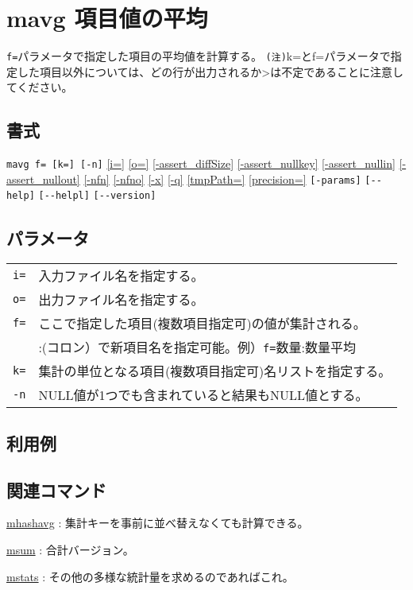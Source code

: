 
%

\section{mavg 項目値の平均\label{sect:mavg}}
\verb|f=|パラメータで指定した項目の平均値を計算する。
\verb|(注)|k=とf=パラメータで指定した項目以外については、どの行が出力されるか>は不定であることに注意してください。\\

\subsection*{書式}
\verb|mavg f= [k=] [-n]|
\hyperref[sect:option_i]{[i=]}
\hyperref[sect:option_o]{[o=]}
\hyperref[sect:option_assert_diffSize]{[-assert\_diffSize]}
\hyperref[sect:option_assert_nullkey]{[-assert\_nullkey]}
\hyperref[sect:option_assert_nullin]{[-assert\_nullin]}
\hyperref[sect:option_assert_nullout]{[-assert\_nullout]}
\hyperref[sect:option_nfn]{[-nfn]} 
\hyperref[sect:option_nfno]{[-nfno]}  
\hyperref[sect:option_x]{[-x]}
\hyperref[sect:option_q]{[-q]}
\hyperref[sect:option_option_tmppath]{[tmpPath=]}
\hyperref[sect:option_precision]{[precision=]}
\verb|[-params]|
\verb|[--help]|
\verb|[--helpl]|
\verb|[--version]|\\

\subsection*{パラメータ}
\begin{table}[htbp]
{\small
\begin{tabular}{ll}
\verb|i=|    & 入力ファイル名を指定する。\\
\verb|o=|    & 出力ファイル名を指定する。\\
\verb|f=|    & ここで指定した項目(複数項目指定可)の値が集計される。\\
             & :(コロン）で新項目名を指定可能。例）\verb|f=|数量:数量平均\\
\verb|k=|    & 集計の単位となる項目(複数項目指定可)名リストを指定する。\\
\verb|-n|    & NULL値が1つでも含まれていると結果もNULL値とする。\\
\end{tabular} 
}
\end{table} 


\subsection*{利用例}

\subsection*{関連コマンド}

\hyperref[sect:mhashavg]{mhashavg} : 集計キーを事前に並べ替えなくても計算できる。

\hyperref[sect:msum]{msum} : 合計バージョン。

\hyperref[sect:mstats]{mstats} : その他の多様な統計量を求めるのであればこれ。

%
